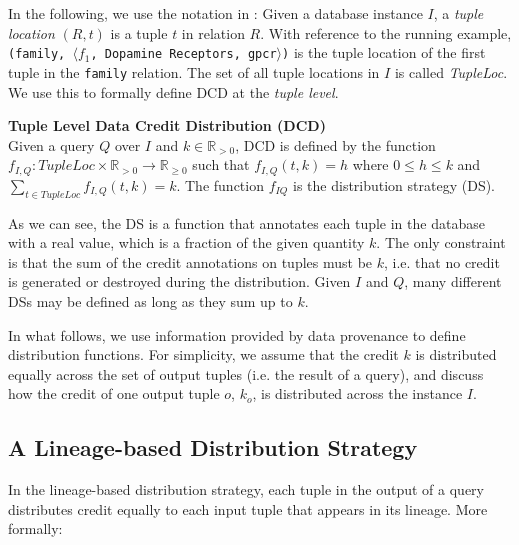 In the following, we use the notation in \citet{CheneyProvSurvey}: Given a database instance $I$, a \emph{tuple location} $(R, t)$ is a tuple $t$ in  relation $R$. With reference to the running example, \texttt{(family, $\langle f_1$, Dopamine Receptors, gpcr$\rangle$)} is the tuple location of the first tuple in the \texttt{family} relation.  The set of all tuple locations in $I$ is called \emph{TupleLoc}.  We use this to formally define DCD at the \emph{tuple level}.


\begin{definition}
    \textbf{Tuple Level Data Credit Distribution (DCD)}~\citep{dosso2020data}
    \label{def:CDT}\\
    Given a query $Q$ over $I$ and $k \in \mathbb{R}_{>0}$, {DCD} is defined by the 
    function $f_{I, Q} : TupleLoc \times \mathbb{R}_{> 0} \rightarrow \mathbb{R}_{\geq0}$ such that $f_{I,Q}(t, k)=h$ where $0 \leq h \leq k$ and $\sum_{t \in TupleLoc}f_{I, Q}(t, k) = k$.  The function $f_{I Q}$ is the distribution strategy (DS).
\end{definition}

As we can see, the DS is a function that annotates each tuple in the database with a real value, which is a fraction of the given quantity $k$. The only constraint is that the sum of the credit annotations on tuples must be $k$, i.e. that no credit is generated or destroyed during the distribution.
Given $I$ and $Q$, many different DSs may be defined as long as they sum up to $k$. 

In what follows, we use information provided by data provenance to define distribution functions.
For simplicity, we assume that the credit $k$ is distributed equally across the set of output tuples (i.e. the result of a query), and discuss how the credit of one output tuple $o$, $k_o$, is distributed across the instance $I$.

\subsection{A Lineage-based Distribution Strategy}
In the lineage-based distribution strategy, each tuple in the output of a query distributes credit equally to each input tuple that appears in its lineage.  More formally:

